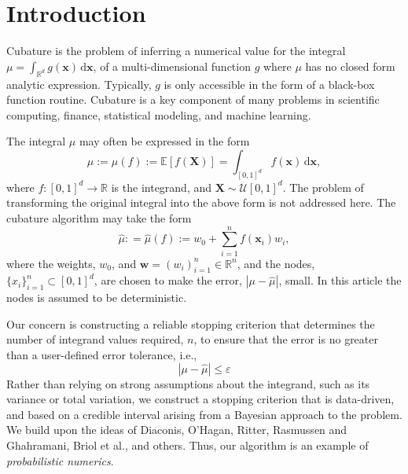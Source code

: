 \documentclass[twocolumn]{svjour3}          %
\newcommand{\bm}[1]{\boldsymbol{#1}}
\newcommand{\dif}[1]{\text{d}{#1}}
\newcommand{\reals}{\mathbb{R}}
\newcommand{\Ex}{\mathbb{E}}
\newcommand{\vw}{\bm{w}}
\newcommand{\vx}{\bm{x}}
\newcommand{\hmu}{\widehat{\mu}}
\newcommand{\errtol}{\varepsilon}
\def\abs#1{\ensuremath{\left \lvert #1 \right \rvert}}
\begin{document}
\section{Introduction}
\label{intro}
Cubature is the problem of inferring a numerical value for the integral 
$\mu = \int_{\reals^d} g(\vx) \, \dif \vx$, of a multi-dimensional function $g$ where $\mu$ has no closed form analytic expression. Typically, $g$ is only accessible in the form of a black-box function routine. 
Cubature is a key component of many problems in scientific computing, finance, statistical modeling, and machine learning.  




The integral $\mu$ may often be expressed in the form
\begin{equation}
\label{eqn:defn_mu}
\mu:= \mu(f) := \Ex[f(\boldsymbol{X})] = \int_{[0,1]^d} f(\vx)\, \dif\vx, 
\end{equation}
where $f:[0,1]^d \to \reals$ is the integrand, and $\boldsymbol{X} \sim \mathcal{U}[0,1]^d$.  The problem of transforming the original integral into the above form is not addressed here.  The cubature algorithm may take the form
\begin{equation}
\label{eqn:defn_hmu}  %
\hmu: = \hmu(f) := w_0 + \sum_{i=1}^{n} f(\vx_i) w_i,
\end{equation}
where the weights, $w_0$, and  $\vw = (w_i)_{i=1}^n \in \reals^n$, and the nodes, $\{x_i\}_{i=1}^n \subset [0,1]^d$, are chosen to make the error, $\abs{\mu - \hmu}$, small.  In this article the nodes is assumed to be deterministic.

Our concern is constructing a reliable stopping criterion that determines the number of integrand values required, $n$, to ensure that the error is no greater than a user-defined error tolerance, i.e., 
\begin{equation}
\label{eqn:err_crit} 
\abs{\mu - \hmu} \leq \errtol 
\end{equation}
Rather than relying on strong assumptions about the integrand, such as its variance or total variation, we construct a stopping criterion that is data-driven, and based on a credible interval arising from a Bayesian approach to the problem.  We build upon the ideas of Diaconis\cite{DiaconisBayesian}, O'Hagan\cite{HagenBayes}, Ritter\cite{RiterAverage}, Rasmussen and Ghahramani\cite{RasmussenBayesian}, Briol et al.\cite{BriEtal18a}, and others.  Thus, our algorithm is an example of \emph{probabilistic numerics}.
\end{document}
